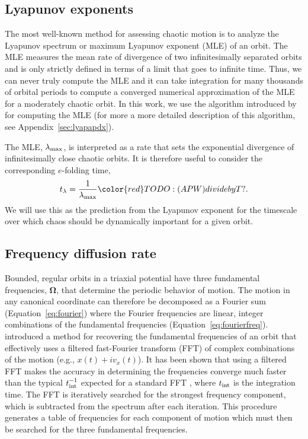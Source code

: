 \documentclass[letterpaper,12pt,preprint]{aastex}
\newcommand{\bs}[1]{\boldsymbol{#1}}
\newcommand{\inttime}{t_{\rm int}}
\newcommand{\todo}[2]{{\color{red} TODO: (\MakeUppercase{#1}) #2}}
\begin{document}
\subsection{Lyapunov exponents} \label{sec:lyap}

The most well-known method for assessing chaotic motion is to analyze the Lyapunov spectrum or maximum Lyapunov exponent (MLE) of an orbit. The MLE measures the mean rate of divergence of two infinitesimally separated orbits and is only strictly defined in terms of a limit that goes to infinite time. Thus, we can never truly compute the MLE and it can take integration for many thousands of orbital periods to compute a converged numerical approximation of the MLE for a moderately chaotic orbit. In this work, we use the algorithm introduced by \cite{wolf85} for computing the MLE (for more a more detailed description of this algorithm, see Appendix~\ref{sec:lyapapdx}).

The MLE, $\lambda_{\rm max}$, is interpreted as a rate that sets the exponential divergence of infinitesimally close chaotic orbits. It is therefore useful to consider the corresponding $e$-folding time, 
\begin{equation}
	t_{\rm \lambda} = \frac{1}{\lambda_{\rm max}} \todo{apw}{divide by T?}.
\end{equation}
We will use this as the prediction from the Lyapunov exponent for the timescale over which chaos should be dynamically important for a given orbit. 

\subsection{Frequency diffusion rate}\label{sec:naff}

Bounded, regular orbits in a triaxial potential have three fundamental frequencies, $\bs{\Omega}$, that determine the periodic behavior of motion. The motion in any canonical coordinate can therefore be decomposed as a Fourier sum (Equation~\ref{eq:fourier}) where the Fourier frequencies are linear, integer combinations of the fundamental frequencies (Equation~\ref{eq:fourierfreq}). \cite{laskar93} introduced a method for recovering the fundamental frequencies of an orbit that effectively uses a filtered fast-Fourier transform (FFT) of complex combinations of the motion (e.g., $x(t) + i v_x(t)$). It has been shown that using a filtered FFT makes the accuracy in determining the frequencies converge much faster than the typical $\inttime^{-1}$ expected for a standard FFT \citep{laskar99}, where $\inttime$ is the integration time. The FFT is iteratively searched for the strongest frequency component, which is subtracted from the spectrum after each iteration. This procedure generates a table of frequencies for each component of motion which must then be searched for the three fundamental frequencies.
\end{document}
